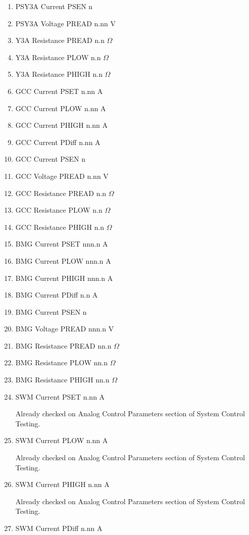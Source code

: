 \documentclass[11pt]{book}		%
\begin{document}
\begin{enumerate}
 \item PSY3A Current PSEN  n
 \item PSY3A Voltage PREAD n.nn V
 \item Y3A Resistance PREAD n.n $\Omega$
 \item Y3A Resistance PLOW n.n $\Omega$
 \item Y3A Resistance PHIGH n.n $\Omega$
 \item GCC Current PSET  n.nn A
 \item GCC Current PLOW  n.nn A
 \item GCC Current PHIGH n.nn A
 \item GCC Current PDiff n.nn A
 \item GCC Current PSEN  n
 \item GCC Voltage PREAD n.nn V
 \item GCC Resistance PREAD n.n $\Omega$
 \item GCC Resistance PLOW n.n $\Omega$
 \item GCC Resistance PHIGH n.n $\Omega$
 \item BMG Current PSET  nnn.n A
 \item BMG Current PLOW  nnn.n A
 \item BMG Current PHIGH nnn.n A
 \item BMG Current PDiff n.n A
 \item BMG Current PSEN  n
 \item BMG Voltage PREAD nnn.n V
 \item BMG Resistance PREAD nn.n $\Omega$
 \item BMG Resistance PLOW nn.n $\Omega$
 \item BMG Resistance PHIGH nn.n $\Omega$
 \item SWM Current PSET  n.nn A

\color{red}
Already checked on Analog Control Parameters section of System Control Testing.
\color{black}

 \item SWM Current PLOW  n.nn A

\color{red}
Already checked on Analog Control Parameters section of System Control Testing.
\color{black}

 \item SWM Current PHIGH n.nn A

\color{red}
Already checked on Analog Control Parameters section of System Control Testing.
\color{black}

 \item SWM Current PDiff n.nn A


\end{enumerate}
\end{document}
